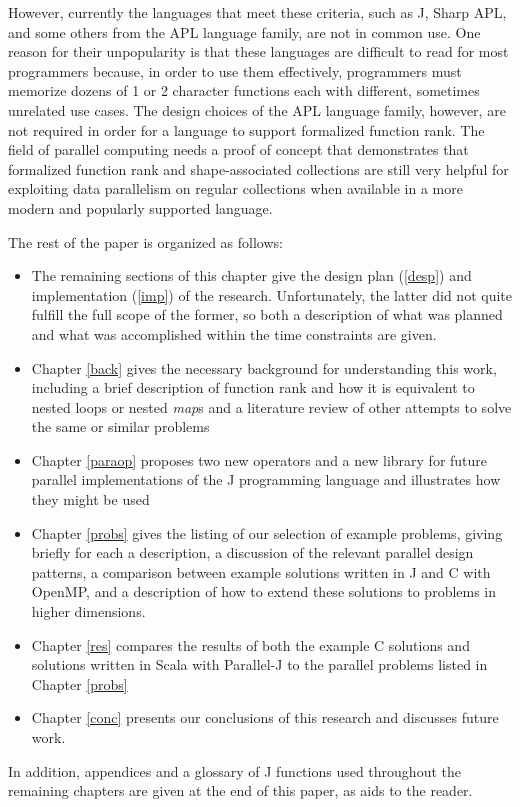 However, currently the languages that meet these criteria, 
such as J, Sharp APL, and some others from the APL language family, 
are not in common use. 
One reason for their unpopularity is that these languages are difficult to read for most programmers %
because, in order to use them effectively, programmers must memorize 
dozens of 1 or 2 character functions each with different, sometimes unrelated use cases\cite{jvocab}\cite{dapl}. 
The design choices of the APL language family, however, 
are not required in order for a language to support formalized function rank.
The field of parallel computing needs a proof of concept that demonstrates 
that formalized function rank and shape-associated collections 
are still very helpful for exploiting data parallelism on regular collections 
when available in a more modern and popularly supported language.

The rest of the paper is organized as follows:
\begin{itemize} 
	\item The remaining sections of this chapter give the design plan (\ref{desp}) and implementation (\ref{imp}) of the research. 
	Unfortunately, the latter did not quite fulfill the full scope of the former, 
	so both a description of what was planned and what was accomplished within the time constraints are given.
	\item Chapter \ref{back} gives the necessary background for understanding this work, 
	including a brief description of function rank and how it is equivalent to nested loops or nested \textit{map}s	
	and a literature review of other attempts to solve the same or similar problems
	\item Chapter \ref{paraop} proposes two new operators and a new library for future parallel implementations of the J programming language 
		and illustrates how they might be used
    \item Chapter \ref{probs} gives the listing of our selection of example problems, 
		giving briefly for each a description, 
		a discussion of the relevant parallel design patterns, 
		a comparison between example solutions written in J and C with OpenMP,
		and a description of how to extend these solutions to problems in higher dimensions.
    \item Chapter \ref{res} compares the results of both the example C solutions and solutions written in Scala with Parallel-J 
		to the parallel problems listed in Chapter \ref{probs}
    \item Chapter \ref{conc} presents our conclusions of this research and discusses future work. 
\end{itemize}
\noindent
In addition, appendices and a glossary of J functions used throughout the remaining chapters 
are given at the end of this paper, as aids to the reader.

